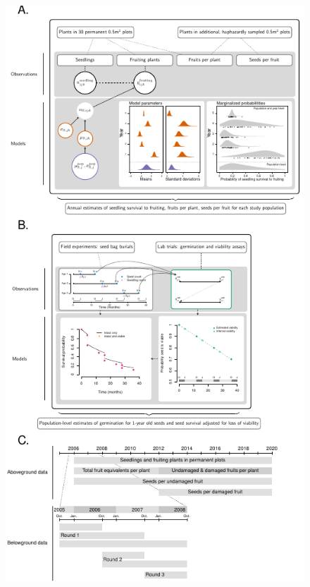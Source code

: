 \documentclass[12pt, oneside, titlepage]{article}   	%
\begin{document}
{ \begin{figure}[!h]
\centering
       \includegraphics[scale=1.2]{../manuscript/figures-overview/diagram-figure.pdf}  
 \caption{  }
   \label{fig:diagram}
 \end{figure}

 


}
\end{document}
